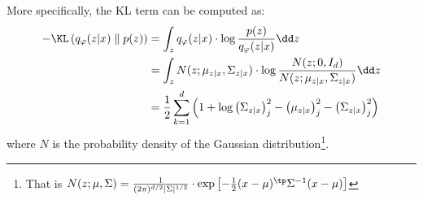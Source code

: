 More specifically, the KL term can be computed as:
\begin{equation*}
    \begin{aligned}
        -\KL\left(q_\varphi(z|x)\parallel p(z)\right) &= \int_z q_\varphi(z|x)\cdot\log\frac{p(z)}{q_\varphi(z|x)}\dd z\\
        &= \int_z N(z; \mu_{z|x}, \Sigma_{z|x})\cdot\log\frac{N(z; 0, I_d)}{N(z; \mu_{z|x}, \Sigma_{z|x})}\dd z\\
        &= \frac{1}{2}\sum_{k=1}^d \left(1 + \log\left(\Sigma_{z|x}\right)^2_j - \left(\mu_{z|x}\right)^2_j - \left(\Sigma_{z|x}\right)^2_j\right)
    \end{aligned}
\end{equation*}
where $N$ is the probability density of the Gaussian distribution\footnote{That is $N(z; \mu, \Sigma) = \frac{1}{(2\pi)^{d/2}|\Sigma|^{1/2}}\cdot\exp\left[-\frac{1}{2}(x-\mu)^\tp\Sigma^{-1}(x-\mu)\right]$}.

\newpage